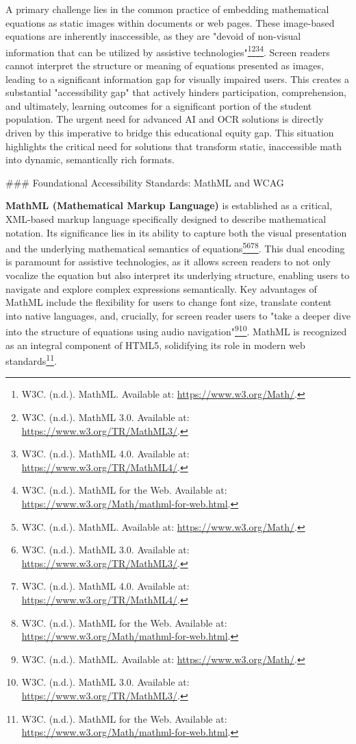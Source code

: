 A primary challenge lies in the common practice of embedding mathematical equations as static images within documents or web pages. These image-based equations are inherently inaccessible, as they are "devoid of non-visual information that can be utilized by assistive technologies"\footnote{W3C. (n.d.). MathML. Available at: \url{https://www.w3.org/Math/}.}\footnote{W3C. (n.d.). MathML 3.0. Available at: \url{https://www.w3.org/TR/MathML3/}.}\footnote{W3C. (n.d.). MathML 4.0. Available at: \url{https://www.w3.org/TR/MathML4/}.}\footnote{W3C. (n.d.). MathML for the Web. Available at: \url{https://www.w3.org/Math/mathml-for-web.html}.}. Screen readers cannot interpret the structure or meaning of equations presented as images, leading to a significant information gap for visually impaired users. This creates a substantial "accessibility gap" that actively hinders participation, comprehension, and ultimately, learning outcomes for a significant portion of the student population. The urgent need for advanced AI and OCR solutions is directly driven by this imperative to bridge this educational equity gap. This situation highlights the critical need for solutions that transform static, inaccessible math into dynamic, semantically rich formats.

### Foundational Accessibility Standards: MathML and WCAG

\textbf{MathML (Mathematical Markup Language)} is established as a critical, XML-based markup language specifically designed to describe mathematical notation. Its significance lies in its ability to capture both the visual presentation and the underlying mathematical semantics of equations\footnote{W3C. (n.d.). MathML. Available at: \url{https://www.w3.org/Math/}.}\footnote{W3C. (n.d.). MathML 3.0. Available at: \url{https://www.w3.org/TR/MathML3/}.}\footnote{W3C. (n.d.). MathML 4.0. Available at: \url{https://www.w3.org/TR/MathML4/}.}\footnote{W3C. (n.d.). MathML for the Web. Available at: \url{https://www.w3.org/Math/mathml-for-web.html}.}. This dual encoding is paramount for assistive technologies, as it allows screen readers to not only vocalize the equation but also interpret its underlying structure, enabling users to navigate and explore complex expressions semantically. Key advantages of MathML include the flexibility for users to change font size, translate content into native languages, and, crucially, for screen reader users to "take a deeper dive into the structure of equations using audio navigation"\footnote{W3C. (n.d.). MathML. Available at: \url{https://www.w3.org/Math/}.}\footnote{W3C. (n.d.). MathML 3.0. Available at: \url{https://www.w3.org/TR/MathML3/}.}. MathML is recognized as an integral component of HTML5, solidifying its role in modern web standards\footnote{W3C. (n.d.). MathML for the Web. Available at: \url{https://www.w3.org/Math/mathml-for-web.html}.}.


